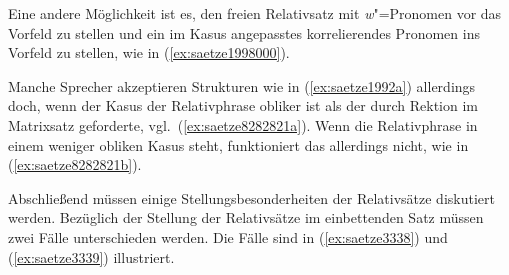 Eine andere Möglichkeit ist es, den freien Relativsatz mit \textit{w}"=Pronomen vor das Vorfeld zu stellen und ein im Kasus angepasstes korrelierendes Pronomen ins Vorfeld zu stellen, wie in (\ref{ex:saetze1998000}).

\begin{exe}
\end{exe}

Manche Sprecher akzeptieren Strukturen wie in (\ref{ex:saetze1992a}) allerdings doch, wenn der Kasus der Relativphrase obliker ist als der durch Rektion im Matrixsatz geforderte, vgl.\ (\ref{ex:saetze8282821a}).
Wenn die Relativphrase in einem weniger obliken Kasus steht, funktioniert das allerdings nicht, wie in (\ref{ex:saetze8282821b}).

\begin{exe}
  \ex\label{ex:saetze8282821} 
  \begin{xlist}
  \end{xlist}
\end{exe}

Abschließend müssen einige Stellungsbesonderheiten der Relativsätze diskutiert werden. 
Bezüglich der Stellung der Relativsätze im einbettenden Satz müssen zwei Fälle unterschieden werden.
Die Fälle sind in (\ref{ex:saetze3338}) und (\ref{ex:saetze3339}) illustriert.

\begin{exe}
  \ex\label{ex:saetze3338}
  \begin{xlist}
  \end{xlist}
  \ex\label{ex:saetze3339}
  \begin{xlist}
  \end{xlist}
\end{exe}

